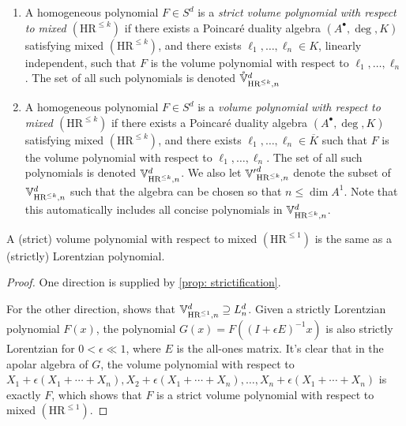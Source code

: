 \begin{definition}
    \begin{enumerate}[leftmargin=*]
        \item A homogeneous polynomial $F\in S^d$ is a \textit{strict volume polynomial with respect to mixed $(\text{HR}^{\leq k})$} if there exists a Poincar\'e duality algebra $(A^\bullet,\deg,K)$ satisfying mixed $(\text{HR}^{\leq k})$, and there exists $\ell_1,\ldots,\ell_n\in K$, linearly independent, such that $F$ is the volume polynomial with respect to $\ell_1,\ldots,\ell_n$. The set of all such polynomials is denoted $\mathring{\Bbb V}^d_{\text{HR}^{\leq k},n}$
        \item A homogeneous polynomial $F\in S^d$ is a \textit{volume polynomial with respect to mixed $(\text{HR}^{\leq k})$} if there exists a Poincar\'e duality algebra $(A^\bullet,\deg,K)$ satisfying mixed $(\text{HR}^{\leq k})$, and there exists $\ell_1,\ldots,\ell_n\in \overline K$ such that $F$ is the volume polynomial with respect to $\ell_1,\ldots,\ell_n$. The set of all such polynomials is denoted $\Bbb V^d_{\text{HR}^{\leq k},n}$. We also let $\Bbb {V'}^{d}_{\text{HR}^{\leq k},n}$ denote the subset of $\Bbb {V}^{d}_{\text{HR}^{\leq k},n}$ such that the algebra can be chosen so that $n\leq\dim A^1$. Note that this automatically includes all concise polynomials in $\Bbb {V}^{d}_{\text{HR}^{\leq k},n}$.
    \end{enumerate}
\end{definition}

\begin{proposition}\label{prop: volume and lorentzian}
    A (strict) volume polynomial with respect to mixed $(\text{HR}^{\leq 1})$ is the same as a (strictly) Lorentzian polynomial.
\end{proposition}

\begin{proof}
    One direction is supplied by \cref{prop: strictification}.

    For the other direction,  shows that $\Bbb V^d_{\text{HR}^{\leq 1},n}\supseteq L^d_n$. Given a strictly Lorentzian polynomial $F(x)$, the polynomial $G(x)=F((I+\epsilon E)^{-1}x)$ is also strictly Lorentzian for $0<\epsilon\ll1$, where $E$ is the all-ones matrix. It's clear that in the apolar algebra of $G$, the volume polynomial with respect to $X_1+\epsilon(X_1+\cdots+X_n),X_2+\epsilon(X_1+\cdots+X_n),\ldots,X_n+\epsilon(X_1+\cdots+X_n)$ is exactly $F$, which shows that $F$ is a strict volume polynomial with respect to mixed $(\text{HR}^{\leq 1})$.
\end{proof}

